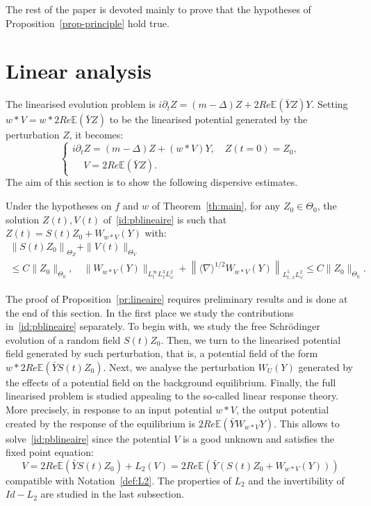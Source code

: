 \documentclass[10pt]{amsart}
\theoremstyle{definition}\newtheorem{defi}[theo]{Definition}\newtheorem{rema}[theo]{Remark}\newtheorem{exam}[theo]{Example}\newtheorem{exem}[theo]{Example}\newtheorem{nota}[theo]{Notation}
\newcommand{\E}{\mathbb{E}}
\begin{document}
The rest of the paper is devoted mainly to prove that the hypotheses of Proposition~\ref{prop-principle} hold true.


\section{Linear analysis}\label{sec:linear}


The linearised evolution problem is $i\partial_t Z=(m-\Delta) Z+2Re \E(\bar Y Z)Y$. Setting $w*V=w*2Re \E(\bar Y Z)$ to be the linearised potential generated by the perturbation $Z$, it becomes:
\begin{equation} \label{id:pblineaire}
\begin{cases}
i\partial_t Z=(m-\Delta) Z+(w*V)Y, \quad Z(t=0)=Z_0,\\
\quad\, V=2Re \E(\bar Y Z).
\end{cases}
\end{equation}
The aim of this section is to show the following dispersive estimates.

\begin{prop}\label{pr:lineaire}

Under the hypotheses on $f$ and $w$ of Theorem~\ref{th:main}, for any $Z_0\in \Theta_0$, the solution $Z(t),V(t)$ of~\eqref{id:pblineaire} is such that $Z(t)=S(t)Z_0+W_{w*V}(Y)$ with:
\begin{multline*}
\left\| S(t)Z_0\right\|_{\Theta_Z}+\| V(t)\|_{\Theta_V}\\
\leq C \| Z_0 \|_{\Theta_0}, \quad \|W_{w*V}(Y)\|_{L^{\infty}_tL^3_xL^2_\omega}+ \left\| \langle \nabla \rangle^{1/2}W_{w*V}(Y)\right\|_{ L^5_{t,\,x}L^2_\omega } \leq C \| Z_0 \|_{\Theta_0}.
\end{multline*}
\end{prop}


The proof of Proposition~\ref{pr:lineaire} requires preliminary results and is done at the end of this section. In the first place we study the contributions in~\eqref{id:pblineaire} separately. To begin with, we study the free Schr\"odinger evolution of a random field $S(t)Z_0$. Then, we turn to the linearised potential field generated by such perturbation, that is, a potential field of the form $w*2Re\E(\bar YS(t)Z_0)$. Next, we analyse the perturbation $W_U(Y)$ generated by the effects of a potential field on the background equilibrium. Finally, the full linearised problem is studied appealing to the so-called linear response theory. More precisely, in response to an input potential $w*V$, the output potential created by the response of the equilibrium is $2Re \E(\bar Y W_{w*V}Y)$. This allows to solve~\eqref{id:pblineaire} since the potential $V$ is a good unknown and satisfies the fixed point equation:
\begin{equation}
V=2Re \E\left(\bar Y S(t)Z_0\right)+L_2(V)=2Re \E\left(\bar Y (S(t)Z_0+W_{w*V}(Y))\right)
\end{equation} 
compatible with Notation~\ref{def:L2}. The properties of $L_2$ and the invertibility of $Id-L_2$ are studied in the last subsection.
\end{document}
